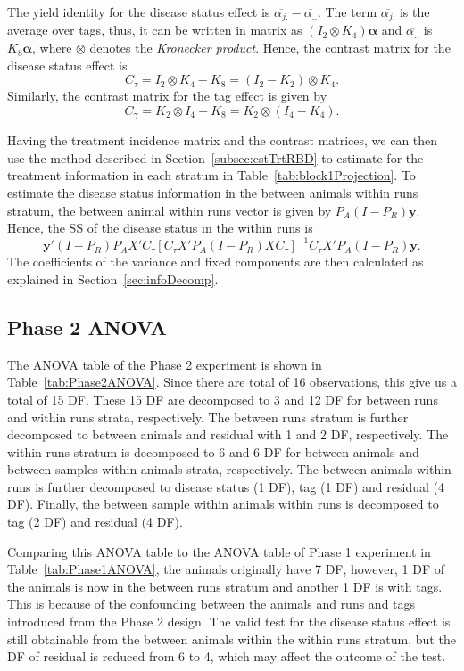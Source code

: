 \documentclass[article]{jss}
\begin{document}
The yield identity for the disease status effect is  $\overline{\alpha_{j.}} -\overline{\alpha_{..}}$. The term $\overline{\alpha_{j.}}$ is the average over tags, thus, it can be written in matrix as $(I_2 \otimes K_4)\bm{\alpha}$ and $\overline{\alpha_{..}}$ is $K_8\bm{\alpha}$, where $\otimes$ denotes the \emph{Kronecker product}. Hence, the contrast matrix for the disease status effect is
\[ C_{\tau} = I_2 \otimes K_4 - K_8 = (I_2 - K_2) \otimes K_4.\]
Similarly, the contrast matrix for the tag effect is given by 
\[ C_{\gamma} =  K_2 \otimes I_4 - K_8 =  K_2 \otimes (I_4 - K_4).\]

Having the treatment incidence matrix and the contrast matrices, we can then use the method described in Section~\ref{subsec:estTrtRBD} to estimate for the treatment information in each stratum in Table~\ref{tab:block1Projection}. To estimate the disease status information in the between animals within runs stratum, the between animal within runs vector is given by $P_A(I-P_R)\bm{y}$. Hence, the SS of the disease status in the within runs is 
\[ \bm{y}'(I-P_R)P_AX'C_{\tau}[C_{\tau}X'P_A(I-P_R)X C_{\tau}]^{-1} C_{\tau}X'P_A(I-P_R)\bm{y}.\]
The coefficients of the variance and fixed components are then calculated as explained in Section~\ref{sec:infoDecomp}.

\subsection{Phase 2 ANOVA}
The ANOVA table of the Phase 2 experiment is shown in Table~\ref{tab:Phase2ANOVA}. Since there are total of 16 observations, this give us a total of 15 DF. These 15 DF are decomposed to 3 and 12 DF for between runs and within runs strata, respectively. The between runs stratum is further decomposed to between animals and residual with 1 and 2 DF, respectively. The within runs stratum is decomposed to 6 and 6 DF for between animals and between samples within animals strata, respectively. The between animals within runs is further decomposed to disease status (1 DF), tag (1 DF) and residual (4 DF). Finally, the between sample within animals within runs is decomposed to tag (2 DF) and residual (4 DF).

Comparing this ANOVA table to the ANOVA table of Phase 1 experiment in Table~\ref{tab:Phase1ANOVA}, the animals originally have 7 DF, however, 1 DF of the animals is now in the between runs stratum and another 1 DF is with tags. This is because of the confounding between the animals and runs and tags introduced from the Phase 2 design. The valid test for the disease status effect is still obtainable from the between animals within the within runs stratum, but the DF of residual is reduced from 6 to 4, which may affect the outcome of the test.
\end{document}
